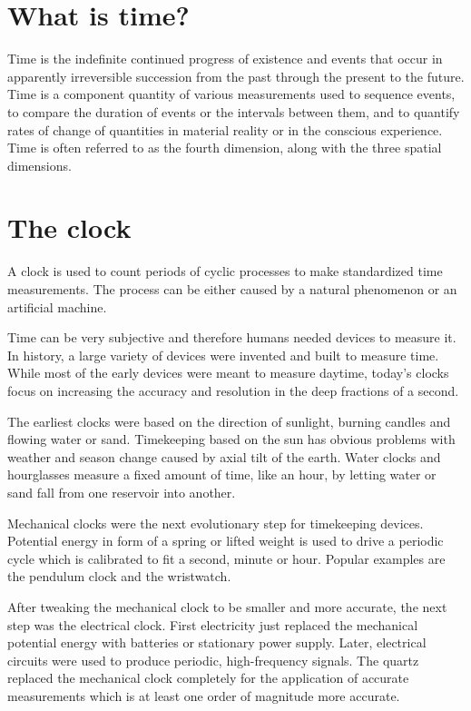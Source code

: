 \section{What is time?}

Time is the indefinite continued progress of existence and events that occur in apparently irreversible succession from the past through the present to the future.
Time is a component quantity of various measurements used to sequence events, to compare the duration of events or the intervals between them, and to quantify rates of change of quantities in material reality or in the conscious experience.
Time is often referred to as the fourth dimension, along with the three spatial dimensions.

\section{The clock}

A clock is used to count periods of cyclic processes to make standardized time measurements. The process can be either caused by a natural phenomenon or an artificial machine.

Time can be very subjective and therefore humans needed devices to measure it. In history, a large variety of devices were invented and built to measure time. While most of the early devices were meant to measure daytime, today’s clocks focus on increasing the accuracy and resolution in the deep fractions of a second.

The earliest clocks were based on the direction of sunlight, burning candles and flowing water or sand. Timekeeping based on the sun has obvious problems with weather and season change caused by axial tilt of the earth. Water clocks and hourglasses measure a fixed amount of time, like an hour, by letting water or sand fall from one reservoir into another.

Mechanical clocks were the next evolutionary step for timekeeping devices. Potential energy in form of a spring or lifted weight is used to drive a periodic cycle which is calibrated to fit a second, minute or hour. Popular examples are the pendulum clock and the wristwatch.

After tweaking the mechanical clock to be smaller and more accurate, the next step was the electrical clock. First electricity just replaced the mechanical potential energy with batteries or stationary power supply. Later, electrical circuits were used to produce periodic, high-frequency signals. The quartz replaced the mechanical clock completely for the application of accurate measurements which is at least one order of magnitude more accurate.

